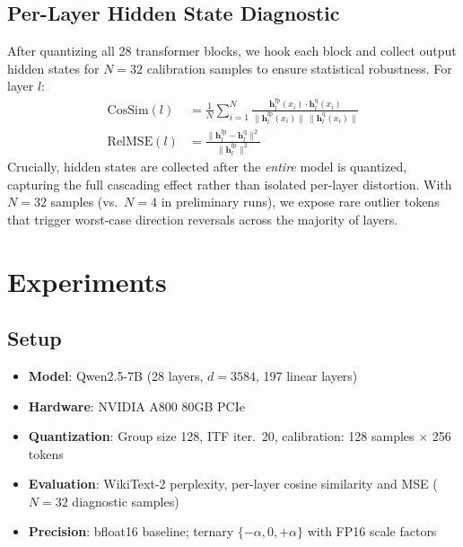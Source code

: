 \documentclass[10pt,a4paper]{article}
\begin{document}
\subsection{Per-Layer Hidden State Diagnostic}

After quantizing all 28 transformer blocks, we hook each block and collect output hidden states for $N{=}32$ calibration samples to ensure statistical robustness.
For layer $l$:
\begin{align}
    \text{CosSim}(l) &= \frac{1}{N} \sum_{i=1}^{N} \frac{\mathbf{h}_l^{\text{fp}}(x_i) \cdot \mathbf{h}_l^{\text{q}}(x_i)}{\|\mathbf{h}_l^{\text{fp}}(x_i)\| \, \|\mathbf{h}_l^{\text{q}}(x_i)\|} \\
    \text{RelMSE}(l) &= \frac{\|\mathbf{h}_l^{\text{fp}} - \mathbf{h}_l^{\text{q}}\|^2}{\|\mathbf{h}_l^{\text{fp}}\|^2}
\end{align}
Crucially, hidden states are collected after the \textit{entire} model is quantized, capturing the full cascading effect rather than isolated per-layer distortion.
With $N{=}32$ samples (vs.\ $N{=}4$ in preliminary runs), we expose rare outlier tokens that trigger worst-case direction reversals across the majority of layers.

\section{Experiments}
\label{sec:experiments}

\subsection{Setup}

\begin{itemize}
    \item \textbf{Model}: Qwen2.5-7B (28 layers, $d=3584$, 197 linear layers)
    \item \textbf{Hardware}: NVIDIA A800 80GB PCIe
    \item \textbf{Quantization}: Group size 128, ITF iter.\ 20, calibration: 128 samples $\times$ 256 tokens
    \item \textbf{Evaluation}: WikiText-2 perplexity, per-layer cosine similarity and MSE ($N{=}32$ diagnostic samples)
    \item \textbf{Precision}: bfloat16 baseline; ternary $\{-\alpha, 0, +\alpha\}$ with FP16 scale factors
\end{itemize}
\end{document}
